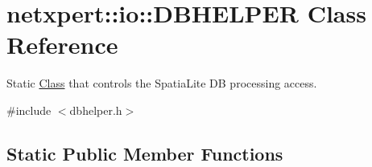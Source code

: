 \hypertarget{classnetxpert_1_1io_1_1DBHELPER}{}\section{netxpert\+:\+:io\+:\+:D\+B\+H\+E\+L\+P\+ER Class Reference}
\label{classnetxpert_1_1io_1_1DBHELPER}


Static \hyperlink{classClass}{Class} that controls the Spatia\+Lite DB processing access.  




{\ttfamily \#include $<$dbhelper.\+h$>$}

\subsection*{Static Public Member Functions}
